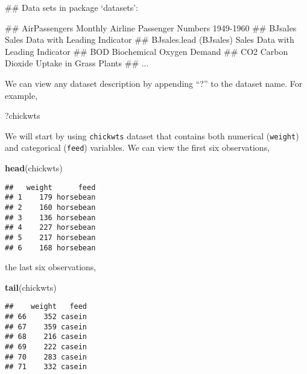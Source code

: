 \documentclass[]{book}
\newenvironment{Shaded}{\begin{snugshade}}{\end{snugshade}}
\newcommand{\KeywordTok}[1]{\textcolor[rgb]{0.13,0.29,0.53}{\textbf{{#1}}}}
\newcommand{\NormalTok}[1]{{#1}}
\theoremstyle{definition}
\theoremstyle{definition}
\theoremstyle{remark}
\begin{document}
\begin{Shaded}
\begin{Highlighting}[]
\NormalTok{## Data sets in package ‘datasets’:}

\NormalTok{## AirPassengers                     Monthly Airline Passenger Numbers 1949-1960}
\NormalTok{## BJsales                           Sales Data with Leading Indicator}
\NormalTok{## BJsales.lead (BJsales)            Sales Data with Leading Indicator}
\NormalTok{## BOD                               Biochemical Oxygen Demand}
\NormalTok{## CO2                               Carbon Dioxide Uptake in Grass Plants}
\NormalTok{## ...}
\end{Highlighting}
\end{Shaded}

We can view any dataset description by appending ``?'' to the dataset
name. For example,

\begin{Shaded}
\begin{Highlighting}[]
\NormalTok{?chickwts}
\end{Highlighting}
\end{Shaded}

We will start by using \texttt{chickwts} dataset that contains both
numerical (\texttt{weight}) and categorical (\texttt{feed}) variables.
We can view the first six observations,

\begin{Shaded}
\begin{Highlighting}[]
\KeywordTok{head}\NormalTok{(chickwts)}
\end{Highlighting}
\end{Shaded}

\begin{verbatim}
##   weight      feed
## 1    179 horsebean
## 2    160 horsebean
## 3    136 horsebean
## 4    227 horsebean
## 5    217 horsebean
## 6    168 horsebean
\end{verbatim}

the last six observations,

\begin{Shaded}
\begin{Highlighting}[]
\KeywordTok{tail}\NormalTok{(chickwts)}
\end{Highlighting}
\end{Shaded}

\begin{verbatim}
##    weight   feed
## 66    352 casein
## 67    359 casein
## 68    216 casein
## 69    222 casein
## 70    283 casein
## 71    332 casein
\end{verbatim}
\end{document}
